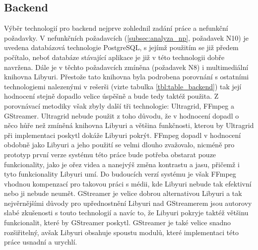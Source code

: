 \documentclass[thesis=M,czech]{FITthesis}[2012/06/26]
\begin{document}
\subsection{Backend} \label{subsec:analyza_technologie_vybrane_backend}
Výběr technologií pro backend nejprve zohlednil zadání práce a nefunkční požadavky. V nefunkčních požadavcích (\ref{subsec:analyza_np}, požadavek N10) je uvedena databázová technologie PostgreSQL, s jejímž použitím se již předem počítalo, neboť databáze stávající aplikace je již v této technologii dobře navržena. Dále je v těchto požadavcích zmíněna (požadavek N8) i multimediální knihovna Libyuri. Přestože tato knihovna byla podrobena porovnání s ostatními technologiemi nalezenými v rešerši (vizte tabulka \ref{tbl:table_backend}) tak její hodnocení stejně dopadlo velice úspěšně a bude tedy taktéž použita. Z porovnávací metodiky však zbyly další tři technologie: Ultragrid, FFmpeg a GStreamer. Ultragrid nebude použit z toho důvodu, že v hodnocení dopadl o něco hůře než zmíněná knihovna Libyuri a většina funkčnosti, kterou by Ultragrid při implementaci poskytl dokáže Libyuri pokrýt. FFmpeg dopadl v hodnocení obdobně jako Libyuri a jeho použití se velmi dlouho zvažovalo, nicméně pro prototyp první verze systému této práce bude potřeba obstarat pouze funkcionality, jako je ořez videa a nanejvýš změna kontrastu a jasu, přičemž i tyto funkcionality Libyuri umí. Do budoucích verzí systému je však FFmpeg vhodnou kompenzací pro takovou práci s médii, kde Libyuri nebude tak efektivní nebo ji nebude neumět. GStreamer je velice dobrou alternativou Libyuri a tak nejvěrnějšími důvody pro upřednostnění Libyuri nad GStreamerem jsou autorovy slabé zkušenosti s touto technologií a navíc to, že Libyuri pokryje taktéž většinu funkcionalit, které by GStreamer poskytl. GStreamer je také velice snadno rozšiřitelný, avšak Libyuri obsahuje spoustu modulů, které implementaci této práce usnadní a urychlí.
\end{document}
